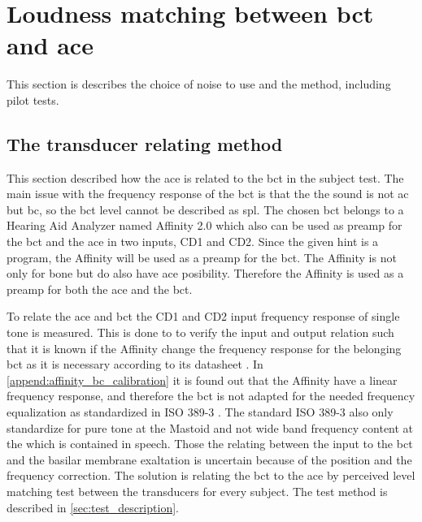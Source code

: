 
\section{Loudness matching between \gls{bct} and \gls{ace}}
\label{sec:loudness_match}
This section is describes the choice of noise to use and the method, including pilot tests.


\subsection{The transducer relating method}

This section described how the \gls{ace} is related to the \gls{bct} in the subject test. The main issue with the frequency response of the \gls{bct} is that the the sound is not \gls{ac} but \gls{bc}, so the \gls{bct} level cannot be described as \gls{spl}. The chosen \gls{bct} belongs to a Hearing Aid Analyzer named Affinity 2.0 \citep{affinity_20} which also can be used as preamp for the \gls{bct} and the \gls{ace} in two inputs, CD1 and CD2. Since the given \gls{hint} is a \matlab program, the Affinity will be used as a preamp for the \gls{bct}. The Affinity is not only for bone but do also have  \gls{ace} posibility. Therefore the Affinity is used as a preamp for both the \gls{ace} and the \gls{bct}. 


To relate the \gls{ace} and \gls{bct} the CD1 and CD2 input frequency response of single tone is measured. This is done to to verify the input and output relation such that it is known if the Affinity change the frequency response for the belonging \gls{bct} as it is necessary according to its datasheet \citep{radioear_b81}. In  \autoref{append:affinity_bc_calibration} it is found out that the Affinity have a linear frequency response, and therefore the \gls{bct} is not adapted for the needed frequency equalization as standardized in ISO 389-3 \citep{iso_389-3}. The standard ISO 389-3 \citep{iso_389-3} also only standardize for pure tone at the Mastoid and not wide band frequency content at the which is contained in speech. Those the relating between the input to the \gls{bct} and the basilar membrane exaltation is uncertain because of the position and the frequency correction. The solution is relating the \gls{bct} to the \gls{ace} by perceived level matching test between the transducers for every subject. The test method is described in \autoref{sec:test_description}.


